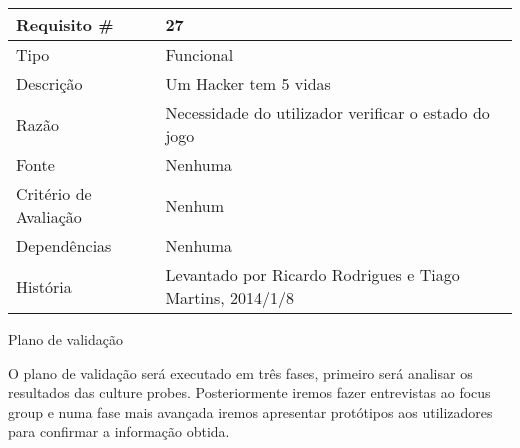 \begin{tabular} {|l|p{8cm}|} 
\hline
Requisito \# & 27 \\
\hline
Tipo & Funcional \\
\hline
Descrição & Um Hacker tem 5 vidas \\
\hline
Razão & Necessidade do utilizador verificar o estado do jogo \\
\hline
Fonte & Nenhuma \\
\hline
Critério de Avaliação & Nenhum \\
\hline
Dependências & Nenhuma \\
\hline
História & Levantado por Ricardo Rodrigues e Tiago Martins, 2014/1/8 \\
\hline
\end{tabular}

Plano de validação

    O plano de validação será executado em três fases, primeiro será analisar os resultados das culture probes. Posteriormente iremos fazer entrevistas ao focus group e numa fase mais avançada iremos apresentar protótipos aos utilizadores para confirmar a informação obtida.
